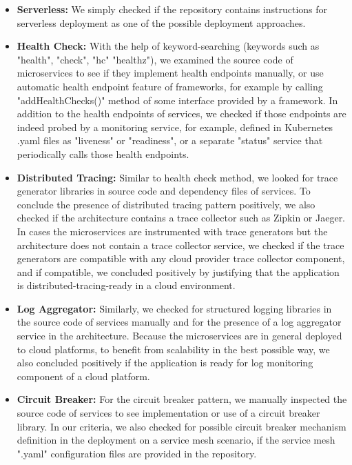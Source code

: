 \documentclass{Configuration_Files/PoliMi3i_thesis}
\begin{document}
\begin{itemize}
\begin{itemize}
        \item \textbf{Serverless:} We simply checked if the repository contains instructions for serverless deployment as one of the possible deployment approaches.
        
        \item \textbf{Health Check:} With the help of keyword-searching (keywords such as "health", "check", "hc" "healthz"), we examined the source code of microservices to see if they implement health endpoints manually, or use automatic health endpoint feature of frameworks, for example by calling "addHealthChecks()" method of some interface provided by a framework.
        In addition to the health endpoints of services, we checked if those endpoints are indeed probed by a monitoring service, for example, defined in Kubernetes .yaml files as "liveness" or "readiness", or a separate "status" service that periodically calls those health endpoints.
        
        \item \textbf{Distributed Tracing:} Similar to health check method, we looked for trace generator libraries in source code and dependency files of services.
        To conclude the presence of distributed tracing pattern positively, we also checked if the architecture contains a trace collector such as Zipkin or Jaeger.
        In cases the microservices are instrumented with trace generators but the architecture does not contain a trace collector service, we checked if the trace generators are compatible with any cloud provider trace collector component, and if compatible, we concluded positively by justifying that the application is distributed-tracing-ready in a cloud environment.
        
        \item \textbf{Log Aggregator:} Similarly, we checked for structured logging libraries in the source code of services manually and for the presence of a log aggregator service in the architecture.
        Because the microservices are in general deployed to cloud platforms, to benefit from scalability in the best possible way, we also concluded positively if the application is ready for log monitoring component of a cloud platform.
        
        \item \textbf{Circuit Breaker:} For the circuit breaker pattern, we manually inspected the source code of services to see implementation or use of a circuit breaker library.
        In our criteria, we also checked for possible circuit breaker mechanism definition in the deployment on a service mesh scenario, if the service mesh ".yaml" configuration files are provided in the repository.
        

\end{itemize}
\end{itemize}
\end{document}

